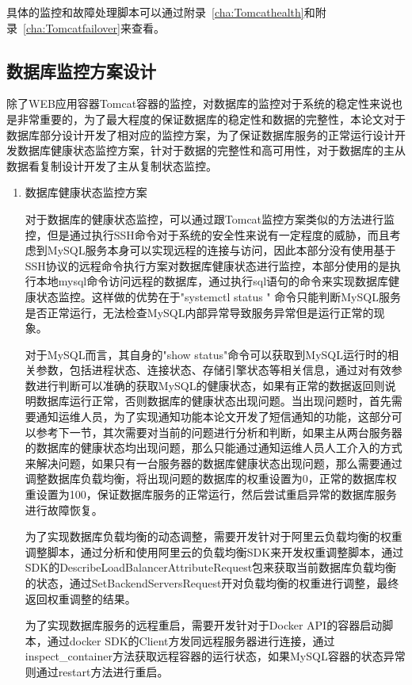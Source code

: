 具体的监控和故障处理脚本可以通过附录~\ref{cha:Tomcathealth}和附录~\ref{cha:Tomcatfailover}来查看。
\subsection{数据库监控方案设计}

除了WEB应用容器Tomcat容器的监控，对数据库的监控对于系统的稳定性来说也是非常重要的，为了最大程度的保证数据库的稳定性和数据的完整性，本论文对于数据库部分设计开发了相对应的监控方案，为了保证数据库服务的正常运行设计开发数据库健康状态监控方案，针对于数据的完整性和高可用性，对于数据库的主从数据看复制设计开发了主从复制状态监控。

\begin{enumerate}
\item 数据库健康状态监控方案

对于数据库的健康状态监控，可以通过跟Tomcat监控方案类似的方法进行监控，但是通过执行SSH命令对于系统的安全性来说有一定程度的威胁，而且考虑到MySQL服务本身可以实现远程的连接与访问，因此本部分没有使用基于SSH协议的远程命令执行方案对数据库健康状态进行监控，本部分使用的是执行本地mysql命令访问远程的数据库，通过执行sql语句的命令来实现数据库健康状态监控。这样做的优势在于"systemctl status " 命令只能判断MySQL服务是否正常运行，无法检查MySQL内部异常导致服务异常但是运行正常的现象。

对于MySQL而言，其自身的"show status"命令可以获取到MySQL运行时的相关参数，包括进程状态、连接状态、存储引擎状态等相关信息，通过对有效参数进行判断可以准确的获取MySQL的健康状态，如果有正常的数据返回则说明数据库运行正常，否则数据库的健康状态出现问题。当出现问题时，首先需要通知运维人员，为了实现通知功能本论文开发了短信通知的功能，这部分可以参考下一节，其次需要对当前的问题进行分析和判断，如果主从两台服务器的数据库的健康状态均出现问题，那么只能通过通知运维人员人工介入的方式来解决问题，如果只有一台服务器的数据库健康状态出现问题，那么需要通过调整数据库负载均衡，将出现问题的数据库的权重设置为0，正常的数据库权重设置为100，保证数据库服务的正常运行，然后尝试重启异常的数据库服务进行故障恢复。

为了实现数据库负载均衡的动态调整，需要开发针对于阿里云负载均衡的权重调整脚本，通过分析和使用阿里云的负载均衡SDK来开发权重调整脚本，通过SDK的DescribeLoadBalancerAttributeRequest包来获取当前数据库负载均衡的状态，通过SetBackendServersRequest开对负载均衡的权重进行调整，最终返回权重调整的结果。

为了实现数据库服务的远程重启，需要开发针对于Docker API的容器启动脚本，通过docker SDK的Client方发同远程服务器进行连接，通过inspect\_container方法获取远程容器的运行状态，如果MySQL容器的状态异常则通过restart方法进行重启。


\end{enumerate}
